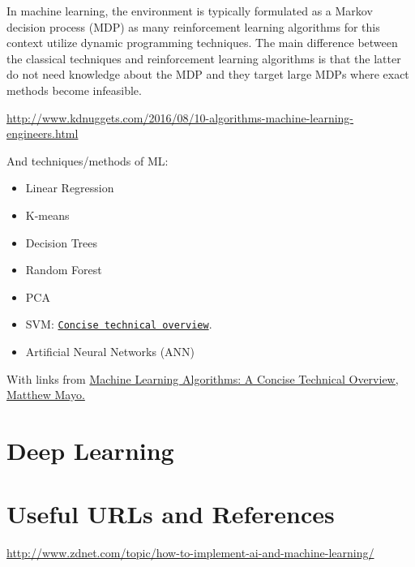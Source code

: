 \documentclass[11pt]{article}
\begin{document}
In machine learning, the environment is typically formulated as a
Markov decision process (MDP) as many reinforcement learning
algorithms for this context utilize dynamic programming
techniques. The main difference between the classical techniques and
reinforcement learning algorithms is that the latter do not need
knowledge about the MDP and they target large MDPs where exact methods
become infeasible.


\smallskip \smallskip
\noindent
\href{http://www.kdnuggets.com/2016/08/10-algorithms-machine-learning-engineers.html}{http://www.kdnuggets.com/2016/08/10-algorithms-machine-learning-engineers.html}


And techniques/methods of ML:
\begin{itemize}
\item{Linear Regression}
\item{K-means} 
\item{Decision Trees}
\item{Random Forest}
\item{PCA}
\item{SVM: 
\href{http://www.kdnuggets.com/2016/09/support-vector-machines-concise-technical-overview.html}{\tt Concise technical overview}. } 
\item{Artificial Neural Networks (ANN)}
\end{itemize}

With links from
\href{https://www.linkedin.com/pulse/machine-learning-algorithms-concise-technical-overview-matthew-mayo}{Machine
Learning Algorithms: A Concise Technical Overview, Matthew Mayo.}


\section{Deep Learning}




\section{Useful URLs and References}
\href{http://www.zdnet.com/topic/how-to-implement-ai-and-machine-learning/}{http://www.zdnet.com/topic/how-to-implement-ai-and-machine-learning/}\\

















\end{document}
